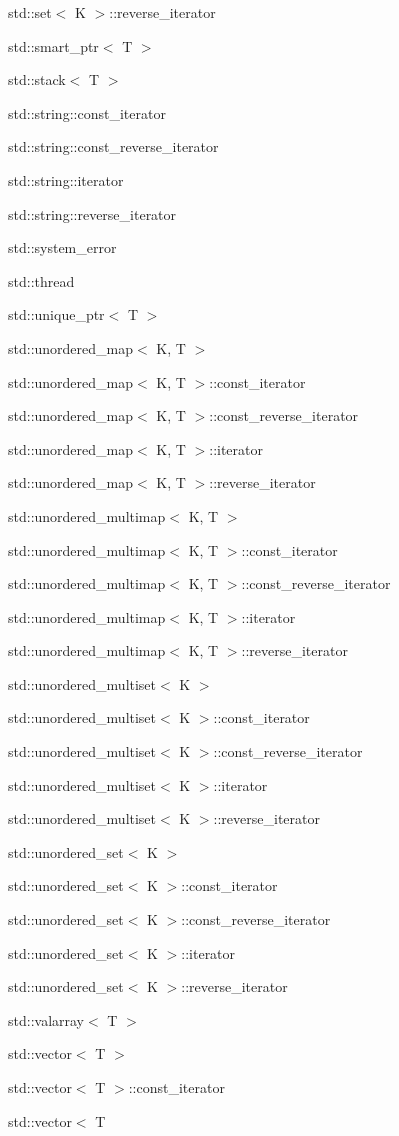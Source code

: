 \begin{DoxyCompactList}
std\+:\+:set$<$ K $>$\+:\+:reverse\+\_\+iterator\item std\+:\+:smart\+\_\+ptr$<$ T $>$\item std\+:\+:stack$<$ T $>$\item std\+:\+:string\+:\+:const\+\_\+iterator\item std\+:\+:string\+:\+:const\+\_\+reverse\+\_\+iterator\item std\+:\+:string\+:\+:iterator\item std\+:\+:string\+:\+:reverse\+\_\+iterator\item std\+:\+:system\+\_\+error\item std\+:\+:thread\item std\+:\+:unique\+\_\+ptr$<$ T $>$\item std\+:\+:unordered\+\_\+map$<$ K, T $>$\item std\+:\+:unordered\+\_\+map$<$ K, T $>$\+:\+:const\+\_\+iterator\item std\+:\+:unordered\+\_\+map$<$ K, T $>$\+:\+:const\+\_\+reverse\+\_\+iterator\item std\+:\+:unordered\+\_\+map$<$ K, T $>$\+:\+:iterator\item std\+:\+:unordered\+\_\+map$<$ K, T $>$\+:\+:reverse\+\_\+iterator\item std\+:\+:unordered\+\_\+multimap$<$ K, T $>$\item std\+:\+:unordered\+\_\+multimap$<$ K, T $>$\+:\+:const\+\_\+iterator\item std\+:\+:unordered\+\_\+multimap$<$ K, T $>$\+:\+:const\+\_\+reverse\+\_\+iterator\item std\+:\+:unordered\+\_\+multimap$<$ K, T $>$\+:\+:iterator\item std\+:\+:unordered\+\_\+multimap$<$ K, T $>$\+:\+:reverse\+\_\+iterator\item std\+:\+:unordered\+\_\+multiset$<$ K $>$\item std\+:\+:unordered\+\_\+multiset$<$ K $>$\+:\+:const\+\_\+iterator\item std\+:\+:unordered\+\_\+multiset$<$ K $>$\+:\+:const\+\_\+reverse\+\_\+iterator\item std\+:\+:unordered\+\_\+multiset$<$ K $>$\+:\+:iterator\item std\+:\+:unordered\+\_\+multiset$<$ K $>$\+:\+:reverse\+\_\+iterator\item std\+:\+:unordered\+\_\+set$<$ K $>$\item std\+:\+:unordered\+\_\+set$<$ K $>$\+:\+:const\+\_\+iterator\item std\+:\+:unordered\+\_\+set$<$ K $>$\+:\+:const\+\_\+reverse\+\_\+iterator\item std\+:\+:unordered\+\_\+set$<$ K $>$\+:\+:iterator\item std\+:\+:unordered\+\_\+set$<$ K $>$\+:\+:reverse\+\_\+iterator\item std\+:\+:valarray$<$ T $>$\item std\+:\+:vector$<$ T $>$\item std\+:\+:vector$<$ T $>$\+:\+:const\+\_\+iterator\item std\+:\+:vector$<$ T 
\end{DoxyCompactList}

